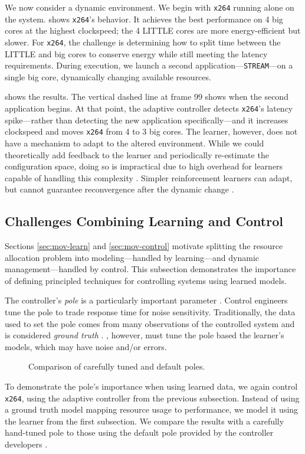 We now consider a dynamic environment.  We begin with \texttt{x264}
running alone on the system.   shows
\texttt{x264}'s behavior.  It achieves the best performance on 4 big
cores at the highest clockspeed; the 4 LITTLE cores are more
energy-efficient but slower.  For \texttt{x264}, the challenge is
determining how to split time between the LITTLE and big cores to
conserve energy while still meeting the latency requirements. During
execution, we launch a second application---\texttt{STREAM}---on a
single big core, dynamically changing available resources.

 shows the results.  The vertical dashed
line at frame 99 shows when the second application begins.  At that
point, the adaptive controller detects \texttt{x264}'s latency
spike---rather than detecting the new application specifically---and
it increases clockspeed and moves \texttt{x264} from 4 to 3 big cores.
The learner, however, does not have a mechanism to adapt to the
altered environment.  While we could theoretically add feedback to the
learner and periodically re-estimate the configuration space, doing so
is impractical due to high overhead for learners capable of handling
this complexity \cite{Paragon,quasar,LEO}.  Simpler reinforcement
learners can adapt, but cannot guarantee reconvergence after the
dynamic change \cite{RL,TAAS}.


\subsection{Challenges Combining Learning and Control}
Sections \ref{sec:mov-learn} and \ref{sec:mov-control} motivate
splitting the resource allocation problem into modeling---handled by
learning---and dynamic management---handled by control. This
subsection demonstrates the importance of defining principled
techniques for controlling systems using learned models.

The controller's \emph{pole} is a particularly important parameter
\cite{HandbookControl}.  Control engineers tune the pole to trade
response time for noise sensitivity.  Traditionally, the data used to
set the pole comes from many observations of the controlled system and
is considered \emph{ground truth} \cite{Hellerstein2004a,sysid}.
\SYSTEM{}, however, must tune the pole based the learner's models,
which may have noise and/or errors.


\begin{figure} 

\caption{Comparison of carefully tuned and default poles.}
\label{fig:not-simple}
\end{figure}
To demonstrate the pole's importance when using learned data, we again
control \texttt{x264}, using the adaptive controller from the
previous subsection. Instead of using a ground truth model mapping
resource usage to performance, we model it using the learner from the
first subsection.  We compare the results with a carefully hand-tuned
pole to those using the default pole provided by the controller
developers \cite{POET}.

